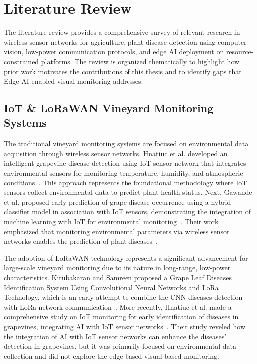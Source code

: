 \chapter{Literature Review}
\label{chap:literature_review}

The literature review provides a comprehensive survey of relevant research in wireless sensor networks for agriculture, plant disease detection using computer vision, low-power communication protocols, and edge AI deployment on resource-constrained platforms. The review is organized thematically to highlight how prior work motivates the contributions of this thesis and to identify gaps that Edge AI-enabled visual monitoring addresses.



\section{IoT \& LoRaWAN Vineyard Monitoring Systems}
\label{sec:iot_lorawan_vineyard}
The traditional vineyard monitoring systems are focused on environmental data acquisition through wireless sensor networks. Hnatiuc et al. developed an intelligent grapevine disease detection using IoT sensor network that integrates environmental sensors for monitoring temperature, humidity, and atmospheric conditions~\cite{hnatiuc2023intelligent}. This approach represents the foundational methodology where IoT sensors collect environmental data to predict plant health status. Next, Gawande et al. proposed early prediction of grape disease occurrence using a hybrid classifier model in association with IoT sensors, demonstrating the integration of machine learning with IoT for environmental monitoring~\cite{gawande2024early}. Their work emphasized that monitoring environmental parameters via wireless sensor networks enables the prediction of plant diseases~\cite{gawande2025analyzing}.

The adoption of LoRaWAN technology represents a significant advancement for large-scale vineyard monitoring due to its nature in long-range, low-power characteristics. Kirubakaran and Samreen proposed a Grape Leaf Diseases Identification System Using Convolutional Neural Networks and LoRa Technology, which is an early attempt to combine the CNN diseases detection with LoRa network communication~\cite{kirubakaran2024grape}. More recently, Hnatiuc et al. made a comprehensive study on IoT monitoring for early identification of diseases in grapevines, integrating AI with IoT sensor networks~\cite{hnatiuc2025aiot}. Their study reveled how the integration of AI with IoT sensor networks can enhance the diseases' detection in grapevines, but it was primarily focused on environmental data collection and did not explore the edge-based visual-based monitoring.



